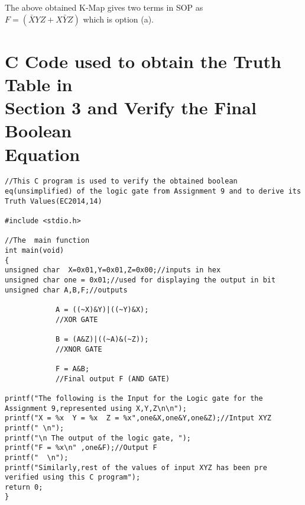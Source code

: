 \documentclass{article}
\begin{document}
The above obtained K-Map gives two terms in SOP as
\\
$F = (\bar{X}{Y}{Z} + {X}\bar{Y}{Z})$ which is option (a).

\section {C Code used to obtain the Truth Table in \\ Section 3 and Verify the Final Boolean\\ Equation}

\begin{lstlisting}[style=CStyle]
//This C program is used to verify the obtained boolean eq(unsimplified) of the logic gate from Assignment 9 and to derive its Truth Values(EC2014,14)

#include <stdio.h>

//The  main function
int main(void)
{
unsigned char  X=0x01,Y=0x01,Z=0x00;//inputs in hex	
unsigned char one = 0x01;//used for displaying the output in bit
unsigned char A,B,F;//outputs

            A = ((~X)&Y)|((~Y)&X);
            //XOR GATE

            B = (A&Z)|((~A)&(~Z));
            //XNOR GATE

            F = A&B;
            //Final output F (AND GATE)

printf("The following is the Input for the Logic gate for the Assignment 9,represented using X,Y,Z\n\n");
printf("X = %x  Y = %x  Z = %x",one&X,one&Y,one&Z);//Intput XYZ
printf(" \n");
printf("\n The output of the logic gate, ");
printf("F = %x\n" ,one&F);//Output F
printf("  \n");
printf("Similarly,rest of the values of input XYZ has been pre verified using this C program");
return 0;
}

\end{lstlisting}
\end{document}
